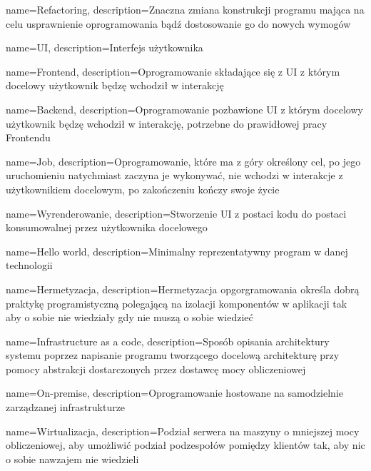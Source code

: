 {
    name={Refactoring},
    description={Znaczna zmiana konstrukcji programu mająca na celu usprawnienie oprogramowania bądź dostosowanie go do nowych wymogów}
}

{
    name={UI},
    description={Interfejs użytkownika}
}

{
    name={Frontend},
    description={Oprogramowanie składające się z UI z którym docelowy użytkownik będzę wchodził w interakcję}
}

{
    name={Backend},
    description={Oprogramowanie pozbawione UI z którym docelowy użytkownik będzę wchodził w interakcję, potrzebne do prawidłowej pracy Frontendu}
}

{
    name={Job},
    description={Oprogramowanie, które ma z góry określony cel, po jego uruchomieniu natychmiast zaczyna je wykonywać, nie wchodzi w interakcje z użytkownikiem docelowym, po zakończeniu kończy swoje życie}
}


{
    name={Wyrenderowanie},
    description={Stworzenie UI z postaci kodu do postaci konsumowalnej przez użytkownika docelowego}
}

{
    name={Hello world},
    description={Minimalny reprezentatywny program w danej technologii}
}

{
    name={Hermetyzacja},
    description={Hermetyzacja opgorgramowania określa dobrą praktykę programistyczną polegającą na izolacji komponentów w aplikacji tak aby o sobie nie wiedziały gdy nie muszą o sobie wiedzieć}
}

{
    name={Infrastructure as a code},
    description={Sposób opisania architektury systemu poprzez napisanie programu tworzącego docelową architekturę przy pomocy abstrakcji dostarczonych przez dostawcę mocy obliczeniowej}
}

{
    name={On-premise},
    description={Oprogramowanie hostowane na samodzielnie zarządzanej infrastrukturze}
}

{
    name={Wirtualizacja},
    description={Podział serwera na maszyny o mniejszej mocy obliczeniowej, aby umożliwić podział podzespołów pomiędzy klientów tak, aby nic o sobie nawzajem nie wiedzieli}
}

